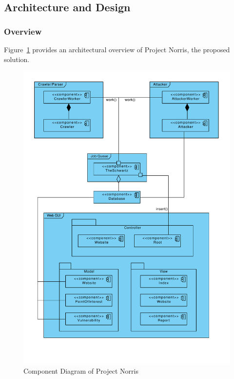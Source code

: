 \documentclass[12pt,a4paper]{article}
\begin{document}
\subsection{Architecture and Design}

\subsubsection{Overview}
Figure~\ref{fig:overview} provides an architectural overview of Project Norris, the proposed solution.

\begin{figure}[!ht]
    \begin{center}
        \includegraphics[scale=0.7]{images/overview_component_diagram.pdf}    
    \end{center}
    \caption{Component Diagram of Project Norris}
    \label{fig:overview}
\end{figure}
\end{document}
